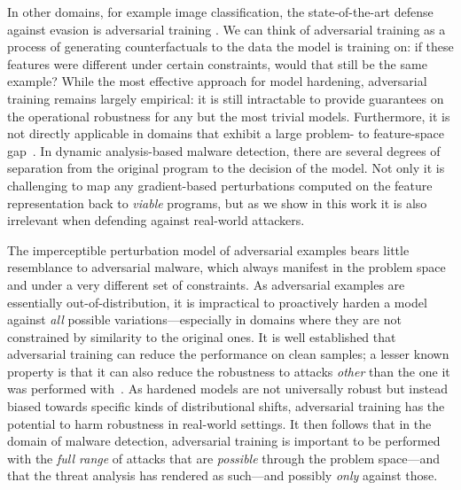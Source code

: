 In other domains, for example image classification, the state-of-the-art defense against evasion is adversarial training \cite{madry2017towards, tramer2020adaptive}.
We can think of adversarial training as a process of generating counterfactuals to the data the model is training on: if these features were different under certain constraints, would that still be the same example?
While the most effective approach for model hardening, adversarial training remains largely empirical: it is still intractable to provide guarantees on the operational robustness for any but the most trivial models.
Furthermore, it is not directly applicable in domains that exhibit a large problem- to feature-space gap~\cite{pierazzi2020intriguing}.
In dynamic analysis-based malware detection, there are several degrees of separation from the original program to the decision of the model.
Not only it is challenging to map any gradient-based perturbations computed on the feature representation back to \textit{viable} programs, but as we show in this work it is also irrelevant when defending against real-world attackers.

The imperceptible perturbation model of adversarial examples bears little resemblance to adversarial malware, which always manifest in the problem space and under a very different set of constraints.
As adversarial examples are essentially out-of-distribution, it is impractical to proactively harden a model against \textit{all} possible variations---especially in domains where they are not constrained by similarity to the original ones.
It is well established that adversarial training can reduce the performance on clean samples; a lesser known property is that it can also reduce the robustness to attacks \textit{other} than the one it was performed with~\cite{gilmer2019a}.
As hardened models are not universally robust but instead biased towards specific kinds of distributional shifts, adversarial training has the potential to harm robustness in real-world settings.
It then follows that in the domain of malware detection, adversarial training is important to be performed with the \textit{full range} of attacks that are \textit{possible} through the problem space---and that the threat analysis has rendered as such---and possibly \textit{only} against those.

